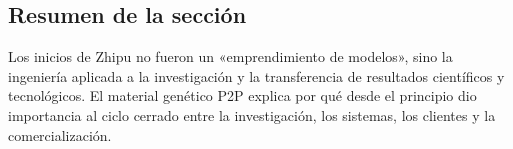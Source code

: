 \subsection{Resumen de la sección}

Los inicios de Zhipu no fueron un «emprendimiento de modelos», sino la ingeniería aplicada a la investigación y la transferencia de resultados científicos y tecnológicos. El material genético P2P explica por qué desde el principio dio importancia al ciclo cerrado entre la investigación, los sistemas, los clientes y la comercialización.
